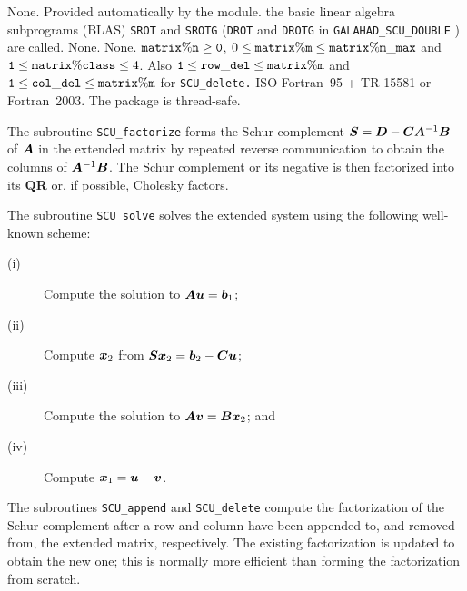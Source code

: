 \documentclass{galahad}
\newcommand{\packagename}{SCU}
\begin{document}

\galgeneral

\galcommon None.
\galworkspace Provided automatically by the module.
\galroutines the basic linear algebra subprograms (BLAS) 
       {\tt SROT} and {\tt SROTG} ({\tt DROT} and {\tt DROTG} in  
        {\tt GALAHAD\_\packagename\_DOUBLE} ) are called. 
\galmodules None.
\galio None.
\galrestrictions ${\tt matrix\%n} \geq {\tt 0}$, 
       $ 0 \leq {\tt matrix\%m} \leq {\tt matrix\%m\_max}$ and 
       ${\tt 1} \leq {\tt matrix\%class} \leq 4$. Also 
       ${\tt 1} \leq {\tt row\_del} \leq {\tt matrix\%m}$ and 
       ${\tt 1} \leq {\tt col\_del} \leq {\tt matrix\%m}$
       for {\tt \packagename\_delete.} 
\galportability ISO Fortran~95 + TR 15581 or Fortran~2003. 
The package is thread-safe.


\galmethod
The subroutine {\tt \packagename\_factorize} forms the Schur complement 
${\bm{S}}  =  {\bm{D}}  -  {\bm{C}}    {\bm{A}}^{-1} {\bm{B}}$ of $ {\bm{A}}$ 
in the extended matrix by repeated reverse communication to 
obtain the columns of 
$ {\bm{A}}^{-1} {\bm{B}}$. The Schur complement or its negative 
is then factorized 
into its {\bf QR } or, if possible, Cholesky factors. 

The subroutine {\tt \packagename\_solve} solves the extended system using 
the following well-known scheme: 

\begin{description} 
\item[(i)] Compute the solution to $ {\bm{A}} {\bm{u}}  =  {\bm{b}}_1$; 
\item[(ii)] Compute ${\bm{x}}_2$ from $ {\bm{S}} {\bm{x}}_2  =  {\bm{b}}_2  -  {\bm{C}} {\bm{u}}$; 
\item[(iii)] Compute the solution to $ {\bm{A}} {\bm{v}}  =  {\bm{B}} {\bm{x}}_2$; and 
\item[(iv)] Compute ${\bm{x}}_1  =  {\bm{u}}  -  {\bm{v}}$. 
\end{description} 


The subroutines {\tt \packagename\_append} and {\tt \packagename\_delete} 
compute the factorization 
of the Schur complement after a row and column have been appended 
to, and removed from, 
the extended matrix, respectively. 
The existing factorization is updated 
to obtain the new one; this is normally more efficient than 
forming the factorization from scratch. 
 
\end{document}
